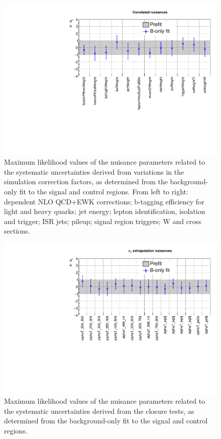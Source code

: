 \begin{figure}[h!]
	\centering
	\includegraphics[width=1.\linewidth]{figs/results/nuis/Correlated_nuisances}
	\caption{Maximum likelihood values of the nuisance parameters related to 
	the systematic uncertainties derived from variations in the simulation 
	correction factors, as determined from the background-only fit to the 
	signal and control regions. From left to right: \pt dependent NLO QCD+EWK 
	corrections; b-tagging efficiency for light and heavy quarks; jet energy; 
	lepton identification, isolation and trigger; ISR jets; pileup; 
	signal region triggers; W and \ttbar cross sections.}
\end{figure}

\begin{figure}[h!]
	\centering
	\includegraphics[width=0.8\linewidth]{figs/results/nuis/AlphaT_nuisances}
	\caption{Maximum likelihood values of the nuisance parameters related to 
	the systematic uncertainties derived from the \alphat closure tests, as 
	determined from the background-only fit to the signal and control regions.}
\end{figure}

